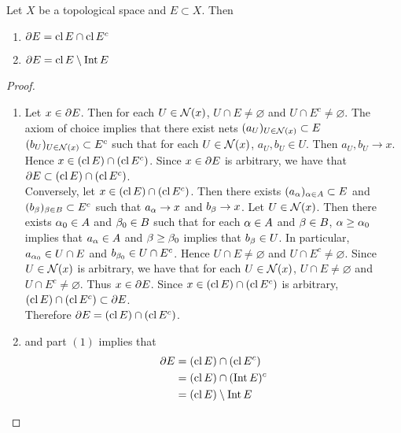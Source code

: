\documentclass{book}
\begin{document}
	\begin{ex} 
		Let $X$ be a topological space and $E \subset X$. Then 
		\begin{enumerate}
			\item $\partial E = \operatorname{cl} E \cap \operatorname{cl} E^c$ 
			\item $\partial E = \operatorname{cl} E \setminus \operatorname{Int} E$
		\end{enumerate}
	\end{ex}
	
	\begin{proof}\
		\begin{enumerate}
			\item Let $x \in \partial E$. Then for each $U \in \mathcal{N}(x)$, $U \cap E \neq \varnothing$ and $U \cap E^c \neq \varnothing$. The axiom of choice implies that there exist nets $(a_U)_{U \in \mathcal{N}(x)} \subset E$ $(b_U)_{U \in \mathcal{N}(x)} \subset E^c$ such that for each $U \in \mathcal{N}(x)$, $a_U, b_U \in U$. Then $a_U, b_U \rightarrow x$. Hence $x \in (\operatorname{cl} E) \cap (\operatorname{cl} E^c)$. Since $x \in \partial E$ is arbitrary, we have that $\partial E \subset (\operatorname{cl} E) \cap (\operatorname{cl} E^c)$. \\
			Conversely, let $x \in (\operatorname{cl} E) \cap (\operatorname{cl} E^c)$. Then there exists $(a_{\alpha})_{\alpha \in A} \subset E$ and $(b_{\beta})_{\beta \in B} \subset E^c$ such that $a_{\alpha} \rightarrow x$ and $b_{\beta} \rightarrow x$. Let $U \in \mathcal{N}(x)$. Then there exists $\alpha_0 \in A$ and $\beta_0 \in B$ such that for each $\alpha \in A$ and $\beta \in B$, $\alpha \geq \alpha_0$ implies that $a_{\alpha} \in A$ and $\beta \geq \beta_0$ implies that $b_{\beta} \in U$. In particular, $a_{\alpha_0} \in U \cap E$ and $b_{\beta_0} \in U \cap E^c$. Hence $U \cap E \neq \varnothing$ and $U \cap E^c \neq \varnothing$. Since $U \in \mathcal{N}(x)$ is arbitrary, we have that for each $U \in \mathcal{N}(x)$, $U \cap E \neq \varnothing$ and $U \cap E^c \neq \varnothing$. Thus $x \in \partial E$. Since $x \in (\operatorname{cl} E) \cap (\operatorname{cl} E^c)$ is arbitrary, $(\operatorname{cl} E) \cap (\operatorname{cl} E^c) \subset \partial E$. \\
			Therefore $\partial E = (\operatorname{cl} E) \cap (\operatorname{cl} E^c)$.
			\item {} and part $(1)$ implies that 
			\begin{align*}
				\partial E
				& = (\operatorname{cl} E) \cap (\operatorname{cl} E^c) \\
				& = (\operatorname{cl} E) \cap (\operatorname{Int} E)^c \\
				& = (\operatorname{cl} E) \setminus \operatorname{Int} E
			\end{align*}
		\end{enumerate}
	\end{proof}
	
\end{document}
